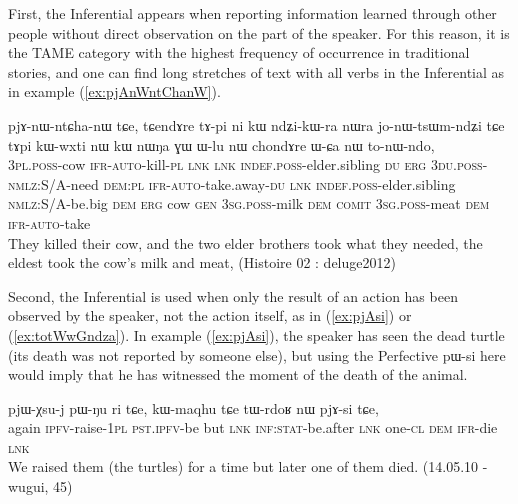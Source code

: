 \documentclass[oldfontcommands,oneside,a4paper,11pt]{article}
\newcommand{\ipa}[1]{{\phon \mbox{#1}}} %
\newcommand{\refb}[1]{(\ref{#1})}
\begin{document}
First, the Inferential appears when reporting information learned through other people without direct observation on the part of the speaker. For this reason, it is the TAME category with the highest frequency of occurrence in traditional stories, and one can find long stretches of text with all verbs in the Inferential as in example \refb{ex:pjAnWntChanW}.

\begin{exe}
\ex \label{ex:pjAnWntChanW}
\gll  \ipa{nɯ-nɯŋa} 	\ipa{pjɤ-nɯ-ntɕha-nɯ} 	\ipa{tɕe,} \ipa{tɕendɤre} 	\ipa{tɤ-pi} 	\ipa{ni} 	\ipa{kɯ} 	\ipa{ndʑi-kɯ-ra} 	\ipa{nɯra} 	\ipa{jo-nɯ-tsɯm-ndʑi} 	\ipa{tɕe} \ipa{tɤpi} 	\ipa{kɯ-wxti} 	\ipa{nɯ} 	\ipa{kɯ} 	\ipa{nɯŋa} 	\ipa{ɣɯ} 	 \ipa{ɯ-lu} 	\ipa{nɯ} 	\ipa{chondɤre} \ipa{ɯ-ɕa} 	\ipa{nɯ} 	\ipa{to-nɯ-ndo,} \\
\textsc{3pl.poss}-cow \textsc{ifr}-\textsc{auto}-kill-\textsc{pl} \textsc{lnk}  \textsc{lnk} \textsc{indef.poss}-elder.sibling \textsc{du} \textsc{erg} \textsc{3du.poss}-\textsc{nmlz}:S/A-need \textsc{dem:pl} \textsc{ifr}-\textsc{auto}-take.away-\textsc{du} \textsc{lnk} \textsc{indef.poss}-elder.sibling \textsc{nmlz}:S/A-be.big \textsc{dem} \textsc{erg} cow \textsc{gen} \textsc{3sg.poss}-milk \textsc{dem} \textsc{comit}  \textsc{3sg.poss}-meat  \textsc{dem} \textsc{ifr}-\textsc{auto}-take \\
\glt They killed their cow, and the two elder brothers took what they needed, the eldest took the cow's milk and meat, (Histoire 02 : deluge2012)
\end{exe}



Second, the Inferential is used when only the result of an action has been observed by the speaker, not the action itself, as in \refb{ex:pjAsi} or \refb{ex:totWwGndza}. In example \refb{ex:pjAsi}, the speaker has seen the dead turtle (its death was not reported by someone else), but using the Perfective \ipa{pɯ-si}  here would imply that he has witnessed the moment of the death of the animal. 

\begin{exe}
\ex  \label{ex:pjAsi}
\gll \ipa{li} 	\ipa{pjɯ-χsu-j} 	\ipa{pɯ-ŋu} 	\ipa{ri} 	\ipa{tɕe,} \ipa{kɯ-maqhu} 	\ipa{tɕe} 	\ipa{tɯ-rdoʁ} 	\ipa{nɯ} 	\ipa{pjɤ-si} 	\ipa{tɕe,} \\
again \textsc{ipfv}-raise-\textsc{1pl} \textsc{pst.ipfv}-be but \textsc{lnk} \textsc{inf:stat}-be.after \textsc{lnk}  one-\textsc{cl} \textsc{dem} \textsc{ifr}-die \textsc{lnk} \\
\glt We raised them (the turtles) for a time but later one of them died. (14.05.10 - wugui, 45)
\end{exe}
\end{document}
